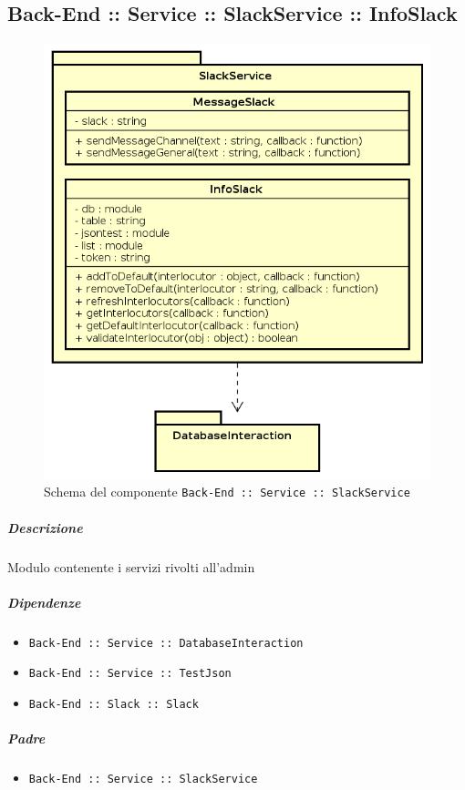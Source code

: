 \documentclass[../ManualeSviluppatore_v1.0.0.tex]{subfiles}
\begin{document}
\subsection{Back-End :: Service :: SlackService :: InfoSlack}
\begin{figure}[!h]
	\centering
	\includegraphics[scale=0.6]{Architettura/Back-End/Service/SlackService.png}
	\caption{Schema del componente \texttt{Back-End :: Service :: SlackService}}
\end{figure}
\subparagraph{Descrizione} Modulo contenente i servizi rivolti all'admin
\subparagraph{Dipendenze}
\begin{itemize}
	\item \texttt{Back-End :: Service :: DatabaseInteraction}
	\item \texttt{Back-End :: Service :: TestJson}
	\item \texttt{Back-End :: Slack :: Slack}
\end{itemize}
\subparagraph{Padre}
\begin{itemize}
	\item \texttt{Back-End :: Service :: SlackService}
\end{itemize}
\end{document}
